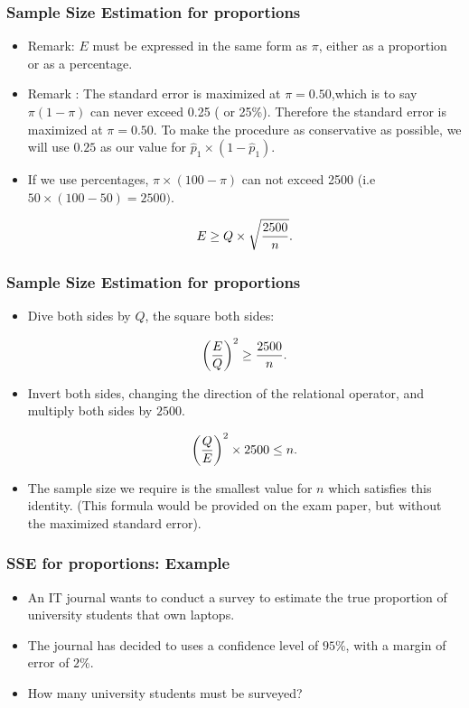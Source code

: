 \documentclass[a4]{beamer}
\begin{document}
\begin{frame}
\frametitle{Sample Size Estimation for proportions}
\begin{itemize}
\item Remark: $E$ must be expressed in the same form as $\pi$, either as a proportion or as a percentage.
\item Remark : The standard error is maximized at $\pi = 0.50$,which is to say $\pi(1-\pi)$ can never exceed 0.25 ( or 25\%). Therefore the standard error is maximized at $\pi = 0.50$. To make the procedure as conservative as possible, we will use $0.25$ as our value for $\hat{p}_1 \times (1 - \hat{p}_1)$.
\item If we use percentages, $\pi \times (100-\pi)$ can not exceed 2500 (i.e $ 50 \times (100-50)=2500)$.

\[ E \geq Q \times \sqrt{{2500 \over n}}. \]


\end{itemize}

\end{frame}
\begin{frame}
\frametitle{Sample Size Estimation for proportions}

\begin{itemize}

\item Dive both sides by $Q$, the square both sides:

\[ \left({E\over Q}\right)^2 \geq {2500 \over n}. \]

\item Invert both sides, changing the direction of the relational operator, and multiply both sides by $2500$.

\[ \left({Q\over E}\right)^2 \times 2500 \leq n. \]

\item The sample size we require is the smallest value for $n$ which satisfies this identity. (This formula would be provided on the exam paper, but without the maximized standard error).
\end{itemize}
\end{frame}
\begin{frame}
\frametitle{SSE for proportions: Example}
\begin{itemize}
\item An IT journal wants to conduct a survey to estimate the true proportion of university students that own laptops.
\item The journal has decided to uses a confidence level of $95\%$, with a margin of error of $2\%$.
\item How many university students must be surveyed?
\end{itemize}
\end{frame}
\end{document}
